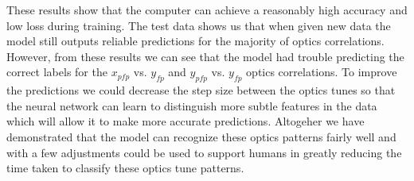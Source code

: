 \documentclass[conference]{IEEEtran}
\begin{document}
These results show that the computer can achieve a reasonably high accuracy and low loss during training. The test data shows us that when given new data the model still outputs reliable predictions for the majority of optics correlations. However, from these results we can see that the model had trouble predicting the correct labels for the $x_{pfp}$ vs. $y_{fp}$ and  $y_{pfp}$ vs. $y_{fp}$  optics correlations. To improve the predictions we could decrease the step size between the optics tunes so that the neural network can learn to distinguish more subtle features in the data which will allow it to make more accurate predictions. Altogeher we have demonstrated that the model can recognize these optics patterns fairly well and with a few adjustments could be used to support humans in greatly reducing the time taken to classify these optics tune patterns.









   

\end{document}
